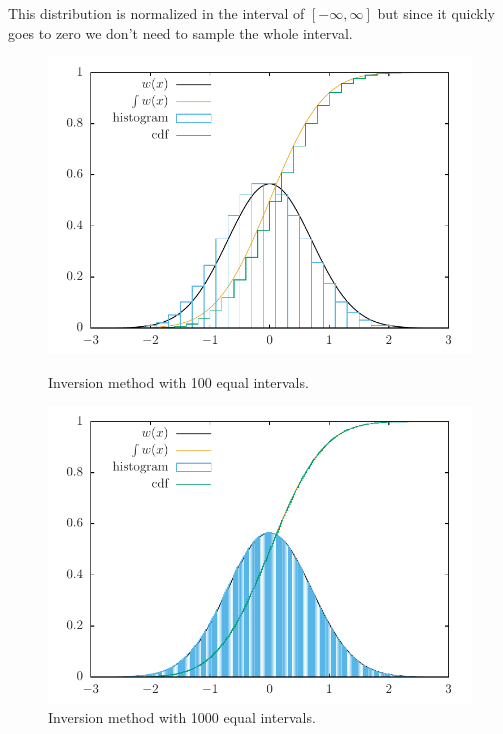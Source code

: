 \documentclass[11pt]{article}
\begin{document}
This distribution is normalized in the interval of $[-\infty,\infty]$ but since it quickly goes to zero we don't need to sample the whole interval.
\vfill
\begin{figure}[H]
  \centering

  \includegraphics[width=.6\linewidth]{inversion-gaussian100}
  \caption{Inversion method with 100 equal intervals.}
\label{fig:inversion-gaussian100}

  \includegraphics[width=.6\linewidth]{inversion-gaussian1000}
  \caption{Inversion method with 1000 equal intervals.}
\label{fig:inversion-gaussian1000}
\end{figure}
\end{document}

